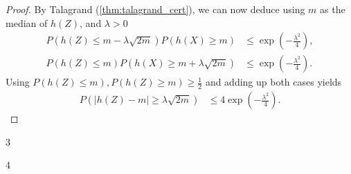 \begin{aufgabe}
\begin{enumerate}[(a)]
\begin{proof}
        By Talagrand (\autoref{thm:talagrand_cert}), we can now deduce using $m$ as the median of $h(Z)$, and $\lambda > 0$
        \begin{align*}
            P(h(Z) \leq m - \lambda\sqrt{2m})P(h(X) \geq m) &\leq \exp\left(-\frac{\lambda^2}{4}\right), \\
            P(h(Z) \leq m )P(h(X) \geq m + \lambda\sqrt{2m}) &\leq \exp\left(-\frac{\lambda^2}{4}\right).
        \end{align*}
        Using $P(h(Z) \leq m), P(h(Z) \geq m) \geq \frac{1}{2}$ and adding up both cases yields
            \begin{align*}
                P(|h(Z) - m | \geq \lambda\sqrt{2m}) &\leq 4\exp\left(-\frac{\lambda^2}{4}\right).
            \end{align*}

    \end{proof}
\end{enumerate}
\end{aufgabe}
\begin{aufgabe}
3
\end{aufgabe}
\begin{aufgabe}
4
\end{aufgabe}